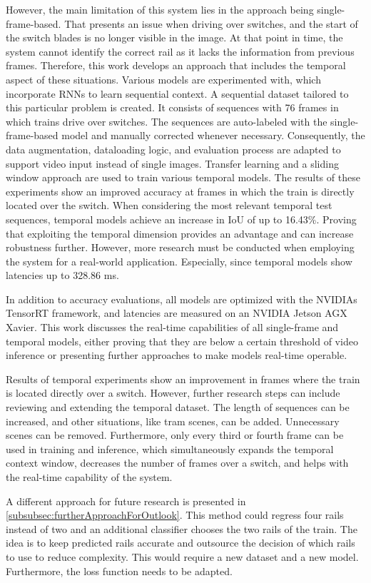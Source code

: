 However, the main limitation of this system lies in the approach being single-frame-based.
That presents an issue when driving over switches, and the start of the switch blades is no longer visible in the image.
At that point in time, the system cannot identify the correct rail as it lacks the information from previous frames.
Therefore, this work develops an approach that includes the temporal aspect of these situations.
Various models are experimented with, which incorporate \ac{RNN}s to learn sequential context.
A sequential dataset tailored to this particular problem is created.
It consists of sequences with 76 frames in which trains drive over switches.
The sequences are auto-labeled with the single-frame-based model and manually corrected whenever necessary.
Consequently, the data augmentation, dataloading logic, and evaluation process are adapted to support video input instead of single images.
Transfer learning and a sliding window approach are used to train various temporal models.
The results of these experiments show an improved accuracy at frames in which the train is directly located over the switch.
When considering the most relevant temporal test sequences, temporal models achieve an increase in \ac{IoU} of up to 16.43\%.
Proving that exploiting the temporal dimension provides an advantage and can increase robustness further.
However, more research must be conducted when employing the system for a real-world application.
Especially, since temporal models show latencies up to 328.86 ms.

In addition to accuracy evaluations, all models are optimized with the NVIDIAs TensorRT framework, and latencies are measured on an NVIDIA Jetson AGX Xavier.
This work discusses the real-time capabilities of all single-frame and temporal models, either proving that they are below a certain threshold of video inference or presenting further approaches to make models real-time operable.

\vspace{2cm}

\noindent Results of temporal experiments show an improvement in frames where the train is located directly over a switch.
However, further research steps can include reviewing and extending the temporal dataset.
The length of sequences can be increased, and other situations, like tram scenes, can be added.
Unnecessary scenes can be removed.
Furthermore, only every third or fourth frame can be used in training and inference, which simultaneously expands the temporal context window, decreases the number of frames over a switch, and helps with the real-time capability of the system.

A different approach for future research is presented in \autoref{subsubsec:furtherApproachForOutlook}.
This method could regress four rails instead of two and an additional classifier chooses the two rails of the train.
The idea is to keep predicted rails accurate and outsource the decision of which rails to use to reduce complexity.
This would require a new dataset and a new model.
Furthermore, the loss function needs to be adapted.
